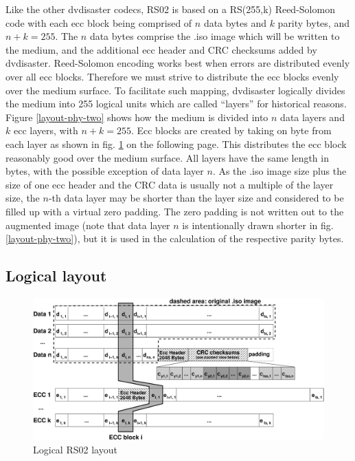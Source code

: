 Like the other dvdisaster codecs, RS02 is based on a  RS(255,k) Reed-Solomon code
with each ecc block being comprised of $n$ data bytes and $k$ parity bytes, and
$n+k=255$. The $n$ data bytes comprise the .iso image which will be
written to the medium, and the additional ecc header and CRC checksums added
by dvdisaster. Reed-Solomon encoding works best when errors are
distributed evenly over all ecc blocks. Therefore we must strive to distribute
the ecc blocks evenly over the medium surface. To facilitate such mapping,
dvdisaster logically divides the medium into 255 logical units which are called
``layers'' for historical reasons. 
Figure \ref{layout-phy-two} shows how the medium is divided into $n$ data layers
and $k$ ecc layers, with $n + k = 255$. Ecc blocks are
created by taking on byte from each layer as shown in fig. \ref{layout-logical-two}
on the following page. This distributes the ecc block reasonably good over
the medium surface. 
All layers have the same length in bytes, with the possible exception of
data layer $n$. As the .iso image size plus the size of one ecc header and the CRC data
is usually not a multiple of the layer size, the $n$-th data layer may be shorter
than the layer size and considered to be filled up with a virtual zero padding. 
The zero padding is not written out to the augmented image (note that data layer $n$
is intentionally drawn shorter in fig. \ref{layout-phy-two}), but it is used in the
calculation of the respective parity bytes.

\newpage

\subsection{Logical layout}
\label{sec-layout-logical-two}

\begin{figure}
 \begin{center}
 \includegraphics[width=\textwidth]{rs02-layout.eps}
 \caption{Logical RS02 layout}
 \label{layout-logical-two}
 \end{center}
\end{figure}


